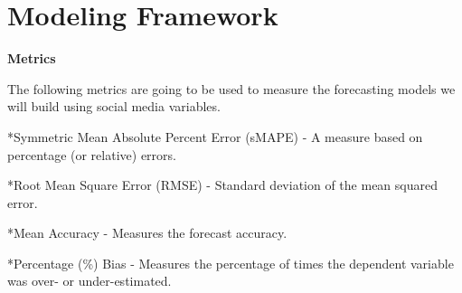 \documentclass[12pt,oneside]{chicagocapstone}
\begin{document}
\section*{Modeling Framework}\label{methodology-modeling}

\textbf{Metrics}

The following metrics are going to be used to measure the forecasting
models we will build using social media variables.

*Symmetric Mean Absolute Percent Error (sMAPE) - A measure based on
percentage (or relative) errors.

*Root Mean Square Error (RMSE) - Standard deviation of the mean squared
error.

*Mean Accuracy - Measures the forecast accuracy.

*Percentage (\%) Bias - Measures the percentage of times the dependent
variable was over- or under-estimated.
\end{document}
